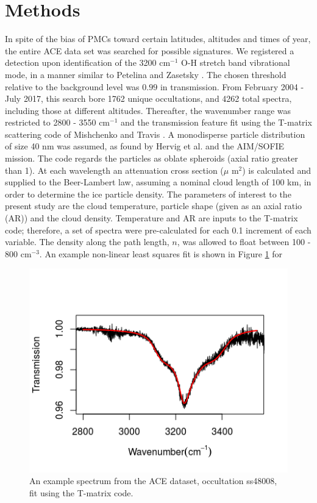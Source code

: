 \documentclass[]{elsarticle}
\begin{document}
\section{Methods} \label{sec:methods}
In spite of the bias of PMCs toward certain latitudes, altitudes and times of year, the entire ACE data set was searched for possible signatures. We registered a detection upon identification of the 3200 cm$^{-1}$ O-H stretch band vibrational mode, in a manner similar to Petelina and Zasetsky \cite{Petelina2009} \cite{Petelina2011}. The chosen threshold relative to the background level was $0.99$ in transmission. From February 2004 - July 2017, this search bore 1762 unique occultations, and 4262 total spectra, including those at different altitudes. Thereafter, the wavenumber range was restricted to 2800 - 3550 cm$^{-1}$ and the transmission feature fit using the T-matrix scattering code of Mishchenko and Travis \cite{Mishchenko1998}.  A monodisperse particle distribution of size 40 nm was assumed, as found by Hervig et al. \cite{Hervig2009} and the AIM/SOFIE mission. The code regards the particles as oblate spheroids (axial ratio greater than 1). At each wavelength an attenuation cross section ($\mu$ m$^{2}$) is calculated and supplied to the Beer-Lambert law, assuming a nominal cloud length of 100 km, in order to determine the ice particle density. 
The parameters of interest to the present study are the cloud temperature, particle shape (given as an axial ratio (AR)) and the cloud density. Temperature and AR are inputs to the T-matrix code; therefore, a set of spectra were pre-calculated for each 0.1 increment of each variable. The density along the path length, $n$, was allowed to float between 100 - 800 cm$^{-3}$. An example non-linear least squares fit is shown in Figure \ref{fig:Fig1} for 
\begin{figure}
	\includegraphics{figs/exSpec}
	\caption{An example spectrum from the ACE dataset, occultation ss48008, fit using the T-matrix code.}
	\label{fig:Fig1}
\end{figure}
\end{document}
